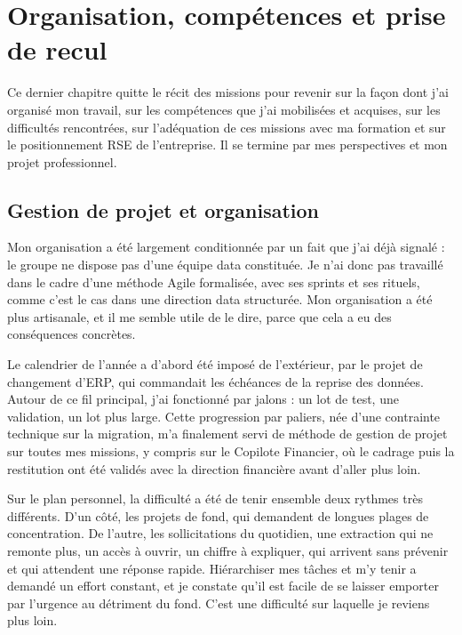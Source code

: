 
\chapter{Organisation, compétences et prise de recul}
\minitoc
\newpage

Ce dernier chapitre quitte le récit des missions pour revenir sur la façon dont j'ai organisé
mon travail, sur les compétences que j'ai mobilisées et acquises, sur les difficultés
rencontrées, sur l'adéquation de ces missions avec ma formation et sur le positionnement RSE de
l'entreprise. Il se termine par mes perspectives et mon projet professionnel.

\section{Gestion de projet et organisation}

Mon organisation a été largement conditionnée par un fait que j'ai déjà signalé : le groupe ne
dispose pas d'une équipe data constituée. Je n'ai donc pas travaillé dans le cadre d'une méthode
Agile formalisée, avec ses sprints et ses rituels, comme c'est le cas dans une direction data
structurée. Mon organisation a été plus artisanale, et il me semble utile de le dire, parce que
cela a eu des conséquences concrètes.

Le calendrier de l'année a d'abord été imposé de l'extérieur, par le projet de changement d'ERP,
qui commandait les échéances de la reprise des données. Autour de ce fil principal, j'ai
fonctionné par jalons : un lot de test, une validation, un lot plus large. Cette progression par
paliers, née d'une contrainte technique sur la migration, m'a finalement servi de méthode de
gestion de projet sur toutes mes missions, y compris sur le Copilote Financier, où le cadrage
puis la restitution ont été validés avec la direction financière avant d'aller plus loin.

Sur le plan personnel, la difficulté a été de tenir ensemble deux rythmes très différents. D'un
côté, les projets de fond, qui demandent de longues plages de concentration. De l'autre, les
sollicitations du quotidien, une extraction qui ne remonte plus, un accès à ouvrir, un chiffre
à expliquer, qui arrivent sans prévenir et qui attendent une réponse rapide. Hiérarchiser mes
tâches et m'y tenir a demandé un effort constant, et je constate qu'il est facile de se laisser
emporter par l'urgence au détriment du fond. C'est une difficulté sur laquelle je reviens plus
loin.

